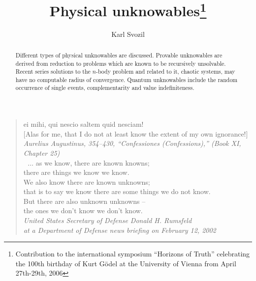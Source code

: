 \documentclass[rmp,amsfonts,showpacs,showkeys,twocolumn]{revtex4}
\begin{document}

\title{Physical unknowables\footnote{Contribution to
the international symposium ``Horizons of Truth''
celebrating the 100th birthday of Kurt G\"odel
at  the University of Vienna from April 27th-29th, 2006}}

\author{Karl Svozil}


\begin{abstract}
Different types of physical unknowables are discussed.
Provable unknowables are derived from reduction to problems which are known to be recursively unsolvable.
Recent series solutions to the $n$-body problem and related to it, chaotic systems, may have no computable radius of convergence.
Quantum unknowables include the random occurrence of single events, complementarity and value indefiniteness.
\end{abstract}



\maketitle

\tableofcontents


\begin{quote}
\begin{flushright}
{\footnotesize
ei mihi, qui nescio saltem quid nesciam!\\
$[$Alas for me, that I do not at least know the extent of my own ignorance!$]$  \\
{\em Aurelius Augustinus, 354--430, ``Confessiones (Confessions),'' (Book XI, Chapter 25)}
\\ $\;$
\\ $\;$
$\ldots$ as we know, there are known knowns; \\
there are things we know we know. \\
We also know there are known unknowns; \\
that is to say we know there are some things we do not know. \\
But there are also unknown unknowns --\\
the ones we don't know we don't know.  \\
{\em United States Secretary of Defense Donald H. Rumsfeld \\
at a Department of Defense news briefing on February 12, 2002}
 }
\end{flushright}
\end{quote}
\end{document}
